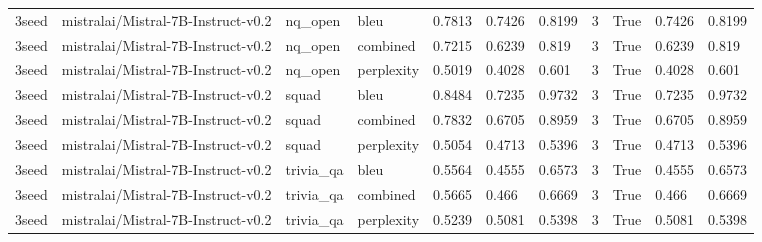 \begin{tabular}{lllllllllll}
3seed & mistralai/Mistral-7B-Instruct-v0.2 & nq\_open & bleu & 0.7813 & 0.7426 & 0.8199 & 3 & True & 0.7426 & 0.8199 \\
3seed & mistralai/Mistral-7B-Instruct-v0.2 & nq\_open & combined & 0.7215 & 0.6239 & 0.819 & 3 & True & 0.6239 & 0.819 \\
3seed & mistralai/Mistral-7B-Instruct-v0.2 & nq\_open & perplexity & 0.5019 & 0.4028 & 0.601 & 3 & True & 0.4028 & 0.601 \\
3seed & mistralai/Mistral-7B-Instruct-v0.2 & squad & bleu & 0.8484 & 0.7235 & 0.9732 & 3 & True & 0.7235 & 0.9732 \\
3seed & mistralai/Mistral-7B-Instruct-v0.2 & squad & combined & 0.7832 & 0.6705 & 0.8959 & 3 & True & 0.6705 & 0.8959 \\
3seed & mistralai/Mistral-7B-Instruct-v0.2 & squad & perplexity & 0.5054 & 0.4713 & 0.5396 & 3 & True & 0.4713 & 0.5396 \\
3seed & mistralai/Mistral-7B-Instruct-v0.2 & trivia\_qa & bleu & 0.5564 & 0.4555 & 0.6573 & 3 & True & 0.4555 & 0.6573 \\
3seed & mistralai/Mistral-7B-Instruct-v0.2 & trivia\_qa & combined & 0.5665 & 0.466 & 0.6669 & 3 & True & 0.466 & 0.6669 \\
3seed & mistralai/Mistral-7B-Instruct-v0.2 & trivia\_qa & perplexity & 0.5239 & 0.5081 & 0.5398 & 3 & True & 0.5081 & 0.5398 \\
\bottomrule
\end{tabular}
